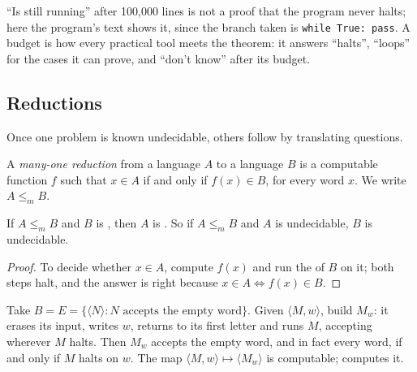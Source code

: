 \label{out:b3:computability:diagonal}

``Is still running'' after 100,000 lines is not a proof that the program never halts; here the program's text shows it, since the branch taken is \texttt{while True:\ pass}. A budget is how every practical tool meets the theorem: it answers ``halts'', ``loops'' for the cases it can prove, and ``don't know'' after its budget.

\subsection{Reductions}

Once one problem is known undecidable, others follow by translating questions.

\begin{definition}\label{def:b3:computability:reduction}
A \emph{many-one reduction} from a language $A$ to a language $B$ is a computable function $f$ such that $x \in A$ if and only if $f(x) \in B$, for every word $x$. We write $A \le_m B$.
\end{definition}

\begin{theorem}\label{thm:b3:computability:reduction}
If $A \le_m B$ and $B$ is , then $A$ is . So if $A \le_m B$ and $A$ is undecidable, $B$ is undecidable.
\end{theorem}

\begin{proof}
To decide whether $x \in A$, compute $f(x)$ and run the  of $B$ on it; both steps halt, and the answer is right because $x \in A \iff f(x) \in B$.
\end{proof}

Take $B = E = \{ \langle N \rangle : N \text{ accepts the empty word} \}$. Given $\langle M, w \rangle$, build $M_w$: it erases its input, writes $w$, returns to its first letter and runs $M$, accepting wherever $M$ halts. Then $M_w$ accepts the empty word, and in fact every word, if and only if $M$ halts on $w$. The map $\langle M, w \rangle \mapsto \langle M_w \rangle$ is computable;  computes it.

